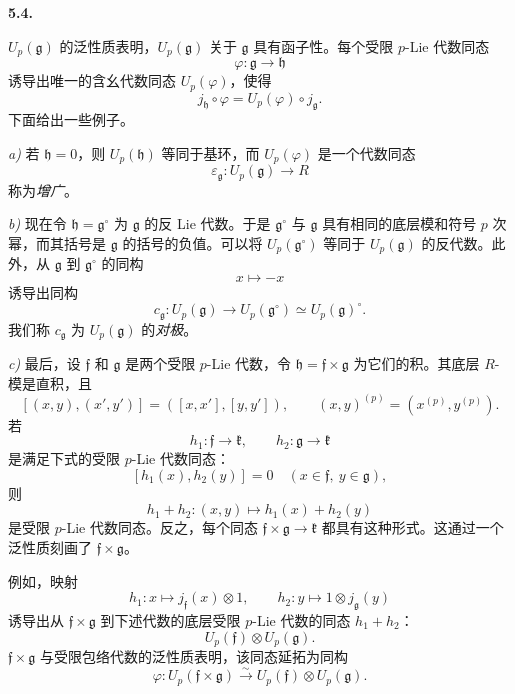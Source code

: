 
\medskip
\noindent\textbf{5.4.}
\label{sga3:VIIA:5.4}

\(U_p(\mathfrak g)\) 的泛性质表明，\(U_p(\mathfrak g)\) 关于 \(\mathfrak g\) 具有函子性。每个受限 \(p\)-Lie 代数同态
\[
  \varphi:\mathfrak g\longrightarrow\mathfrak h
\]
诱导出唯一的含幺代数同态 \(U_p(\varphi)\)，使得
\[
  j_{\mathfrak h}\circ\varphi
  =
  U_p(\varphi)\circ j_{\mathfrak g}.
\]
下面给出一些例子。

\smallskip
\noindent\textit{a)}
若 \(\mathfrak h=0\)，则 \(U_p(\mathfrak h)\) 等同于基环，而 \(U_p(\varphi)\) 是一个代数同态
\[
  \varepsilon_{\mathfrak g}:
  U_p(\mathfrak g)\longrightarrow R
\]
称为\emph{增广}。

\smallskip
\noindent\textit{b)}
现在令 \(\mathfrak h=\mathfrak g^\circ\) 为 \(\mathfrak g\) 的反 Lie 代数。于是 \(\mathfrak g^\circ\) 与 \(\mathfrak g\) 具有相同的底层模和符号 \(p\) 次幂，而其括号是 \(\mathfrak g\) 的括号的负值。可以将 \(U_p(\mathfrak g^\circ)\) 等同于 \(U_p(\mathfrak g)\) 的反代数。此外，从 \(\mathfrak g\) 到 \(\mathfrak g^\circ\) 的同构
\[
  x\longmapsto-x
\]
诱导出同构
\[
  c_{\mathfrak g}:
  U_p(\mathfrak g)
  \longrightarrow
  U_p(\mathfrak g^\circ)
  \simeq
  U_p(\mathfrak g)^\circ.
\]
我们称 \(c_{\mathfrak g}\) 为 \(U_p(\mathfrak g)\) 的\emph{对极}。

\smallskip
\noindent\textit{c)}
最后，设 \(\mathfrak f\) 和 \(\mathfrak g\) 是两个受限 \(p\)-Lie 代数，令 \(\mathfrak h=\mathfrak f\times\mathfrak g\) 为它们的积。其底层 \(R\)-模是直积，且
\[
  [(x,y),(x',y')]
  =
  ([x,x'],[y,y']),
  \qquad
  (x,y)^{(p)}
  =
  (x^{(p)},y^{(p)}).
\]
若
\[
  h_1:\mathfrak f\to\mathfrak k,
  \qquad
  h_2:\mathfrak g\to\mathfrak k
\]
是满足下式的受限 \(p\)-Lie 代数同态：
\[
  [h_1(x),h_2(y)]=0
  \quad
  (x\in\mathfrak f,\ y\in\mathfrak g),
\]
则
\[
  h_1+h_2:(x,y)\longmapsto h_1(x)+h_2(y)
\]
是受限 \(p\)-Lie 代数同态。反之，每个同态 \(\mathfrak f\times\mathfrak g\to\mathfrak k\) 都具有这种形式。这通过一个泛性质刻画了 \(\mathfrak f\times\mathfrak g\)。

例如，映射
\[
  h_1:x\longmapsto j_{\mathfrak f}(x)\otimes1,
  \qquad
  h_2:y\longmapsto1\otimes j_{\mathfrak g}(y)
\]
诱导出从 \(\mathfrak f\times\mathfrak g\) 到下述代数的底层受限 \(p\)-Lie 代数的同态 \(h_1+h_2\)：
\[
  U_p(\mathfrak f)\otimes U_p(\mathfrak g).
\]
\(\mathfrak f\times\mathfrak g\) 与受限包络代数的泛性质表明，该同态延拓为同构
\[
  \varphi:
  U_p(\mathfrak f\times\mathfrak g)
  \xrightarrow{\sim}
  U_p(\mathfrak f)\otimes U_p(\mathfrak g).
\]


